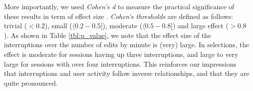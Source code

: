 \documentclass[conference]{IEEEtran}
\begin{document}
More importantly, we used \textit{Cohen's d} to measure the practical significance of these results in term of effect size %
\cite{C94}. \textit{Cohen's thresholds} are defined as follows: trivial ($<0.2$), small  ($\langle 0.2 - 0.5 ]$), moderate ($\langle 0.5 - 0.8 ]$) and large effect ($> 0.8$). As shown in Table \ref{tbl:p_value}, we note that the effect size of the interruptions over the number of edits by minute is (very) large. In selections, the effect is moderate for sessions having up three interruptions, and large to very large for sessions with over four interruptions. This reinforces our impressions that interruptions and user activity follow inverse relationships, and that they are quite pronounced.

\end{document}
